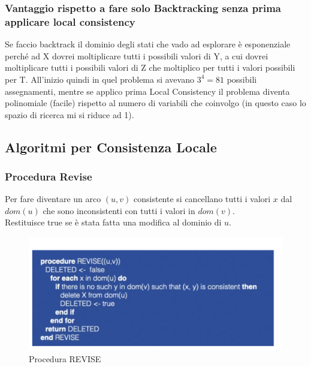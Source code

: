 \subsubsection{\textbf{Vantaggio rispetto a fare solo Backtracking senza prima
        applicare local consistency}} Se faccio backtrack il dominio degli stati che
vado ad esplorare è esponenziale perché ad X dovrei moltiplicare tutti i
possibili valori di Y, a cui dovrei moltiplicare tutti i possibili valori di Z
che moltiplico per tutti i valori possibili per T. All'inizio quindi in quel
problema si avevano $3^4 = 81$ possibili assegnamenti, mentre se applico prima
Local Consistency il problema diventa polinomiale (facile) rispetto al numero di
variabili che coinvolgo (in questo caso lo spazio di ricerca mi si riduce ad 1).

\subsection{Algoritmi per Consistenza Locale}
\subsubsection{Procedura Revise}
Per fare diventare un arco $(u,v)$ consistente si cancellano tutti i valori $x$ dal
$dom(u)$ che sono inconsistenti con tutti i valori in $dom(v)$. \\Restituisce true se
è stata fatta una modifica al dominio di $u$.
\begin{figure}[htp]
    \centering
    \includegraphics[width=13cm, keepaspectratio]{img/Cap3/revise.png}
    \caption{Procedura REVISE}
\end{figure}

